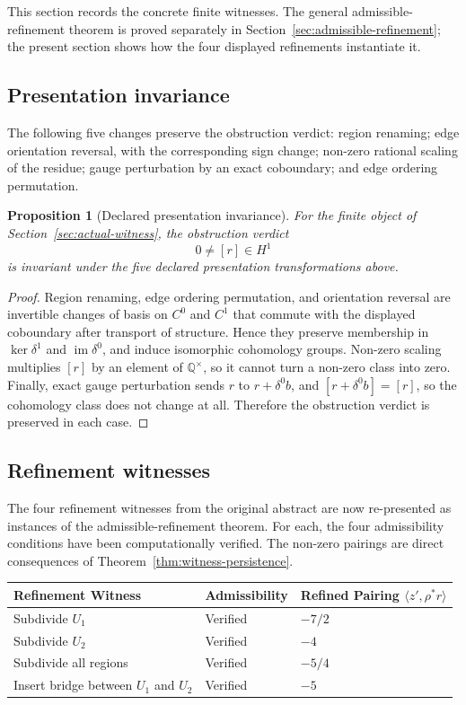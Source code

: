 \documentclass[11pt]{article}
\newtheorem{proposition}[theorem]{Proposition}
\newcommand{\im}{\operatorname{im}}
\newcommand{\Q}{\mathbb{Q}}
\begin{document}
This section records the concrete finite witnesses. The general admissible-refinement theorem is proved separately in Section~\ref{sec:admissible-refinement}; the present section shows how the four displayed refinements instantiate it.

\subsection{Presentation invariance}

The following five changes preserve the obstruction verdict: region renaming; edge orientation reversal, with the corresponding sign change; non-zero rational scaling of the residue; gauge perturbation by an exact coboundary; and edge ordering permutation.

\begin{proposition}[Declared presentation invariance]
For the finite object of Section~\ref{sec:actual-witness}, the obstruction verdict
\[
0\neq [r]\in H^1
\]
is invariant under the five declared presentation transformations above.
\end{proposition}

\begin{proof}
Region renaming, edge ordering permutation, and orientation reversal are invertible changes of basis on \(C^0\) and \(C^1\) that commute with the displayed coboundary after transport of structure. Hence they preserve membership in \(\ker\delta^1\) and \(\im\delta^0\), and induce isomorphic cohomology groups. Non-zero scaling multiplies \([r]\) by an element of \(\Q^\times\), so it cannot turn a non-zero class into zero. Finally, exact gauge perturbation sends \(r\) to \(r+\delta^0b\), and \([r+\delta^0b]=[r]\), so the cohomology class does not change at all. Therefore the obstruction verdict is preserved in each case.
\end{proof}

\subsection{Refinement witnesses}

The four refinement witnesses from the original abstract are now re-presented as instances of the admissible-refinement theorem. For each, the four admissibility conditions have been computationally verified. The non-zero pairings are direct consequences of Theorem~\ref{thm:witness-persistence}.

\begin{center}
\begin{tabular}{lll}
\toprule
Refinement Witness & Admissibility & Refined Pairing \(\langle z', \rho^*r \rangle\) \\
\midrule
Subdivide \(U_1\) & Verified & \(-7/2\) \\
Subdivide \(U_2\) & Verified & \(-4\) \\
Subdivide all regions & Verified & \(-5/4\) \\
Insert bridge between \(U_1\) and \(U_2\) & Verified & \(-5\) \\
\bottomrule
\end{tabular}
\end{center}
\end{document}
